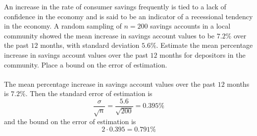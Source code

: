 \documentclass[12pt]{article}
\newcommand{\ques}[1]{\noindent {\bf Question #1: }}
\begin{document}
\ques{8.22} An increase in the rate of consumer savings frequently is tied to a lack of confidence in the economy and is said to be an indicator of a recessional tendency in the economy. A random sampling of $n=200$ savings accounts in a local community showed the mean increase in savings account values to be $7.2\%$ over the past $12$ months, with standard deviation $5.6\%$. Estimate the mean percentage increase in savings account values over the past $12$ months for depositors in the community. Place a bound on the error of estimation. \\~\\
The mean percentage increase in savings account values over the past $12$ months is $7.2\%$. Then the standard error of estimation is $$ \frac{\sigma}{\sqrt{n}} = \frac{5.6}{\sqrt{200}} = 0.395 \% $$ and the bound on the error of estimation is $$ 2 \cdot 0.395 = 0.791\% $$ 
\end{document}

